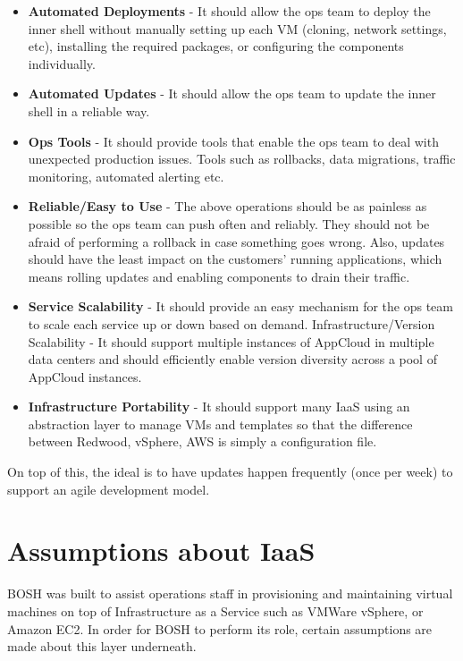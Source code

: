 \begin{itemize}
\item \textbf{Automated Deployments} - It should allow the ops team to deploy the inner shell without manually setting up each VM (cloning, network settings, etc), installing the required packages, or configuring the components individually.

\item \textbf{Automated Updates} - It should allow the ops team to update the inner shell in a reliable way.

\item \textbf{Ops Tools} - It should provide tools that enable the ops team to deal with unexpected production issues. Tools such as rollbacks, data migrations, traffic monitoring, automated alerting etc.

\item \textbf{Reliable\slash Easy to Use} - The above operations should be as painless as possible so the ops team can push often and reliably. They should not be afraid of performing a rollback in case something goes wrong. Also, updates should have the least impact on the customers’ running applications, which means rolling updates and enabling components to drain their traffic.

\item \textbf{Service Scalability} - It should provide an easy mechanism for the ops team to scale each service up or down based on demand. Infrastructure\slash Version Scalability - It should support multiple instances of AppCloud in multiple data centers and should efficiently enable version diversity across a pool of AppCloud instances.

\item \textbf{Infrastructure Portability} - It should support many IaaS using an abstraction layer to manage VMs and templates so that the difference between Redwood, vSphere, AWS is simply a configuration file.

\end{itemize}

On top of this, the ideal is to have updates happen frequently (once per week) to support an agile development model.

\section{Assumptions about IaaS}
\label{assumptionsaboutiaas}

BOSH was built to assist operations staff in provisioning and maintaining virtual machines on top of Infrastructure as a Service such as VMWare vSphere, or Amazon EC2. In order for BOSH to perform its role, certain assumptions are made about this layer underneath.

